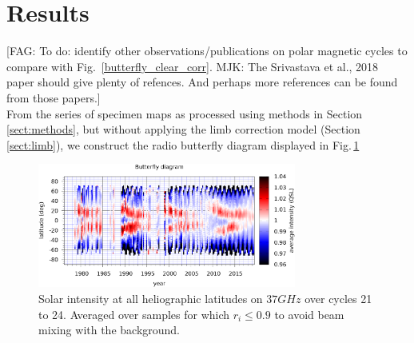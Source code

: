 \documentclass{aa}
\newcommand{\fag}[1]{\textcolor{midpurple}{[FAG: #1]}} %
\begin{document}







\section{Results}\label{sect:results}
\fag{To do: identify other observations/publications on polar magnetic cycles to compare with
Fig.~\ref{butterfly_clear_corr}. MJK: The Srivastava et al., 2018 paper should give plenty of refences. And perhaps more references can be found from those papers.}\\

From the series of specimen maps as processed using methods in 
Section\,\ref{sect:methods}, but without applying the limb correction model
(Section\,\ref{sect:limb}), we construct the radio butterfly diagram  
displayed in Fig.\,\ref{butterfly_clear_raw}

\begin{figure}
\centering
\includegraphics[width=8.5cm]{butterfly_clear_raw.png}
\caption{Solar intensity at all heliographic latitudes on $\si{37}{GHz}$ over cycles 21 to 24. Averaged over samples for which $r_i \le 0.9$ to avoid beam mixing with the background.
}
\label{butterfly_clear_raw}
\end{figure}
\end{document}

